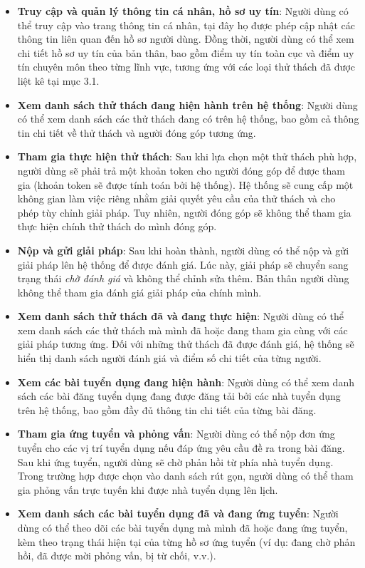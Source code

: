 \begin{itemize}
  \item \textbf{Truy cập và quản lý thông tin cá nhân, hồ sơ uy tín}: Người dùng có thể truy cập vào trang thông tin cá nhân, tại đây họ được phép cập nhật các thông tin liên quan đến hồ sơ người dùng.
        Đồng thời, người dùng có thể xem chi tiết hồ sơ uy tín của bản thân, bao gồm điểm uy tín toàn cục và điểm uy tín chuyên môn theo từng lĩnh vực, tương ứng với các loại thử thách đã được liệt kê tại mục 3.1.
  \item \textbf{Xem danh sách thử thách đang hiện hành trên hệ thống}: Người dùng có thể xem danh sách các thử thách đang có trên hệ thống, bao gồm cả thông tin chi tiết về thử thách và người đóng góp tương ứng.
  \item \textbf{Tham gia thực hiện thử thách}: Sau khi lựa chọn một thử thách phù hợp, người dùng sẽ phải trả một khoản token cho người đóng góp để được tham gia (khoản token sẽ được tính toán bởi hệ thống). Hệ thống sẽ cung cấp một không gian làm việc riêng nhằm giải quyết yêu cầu của thử thách và cho phép tùy chỉnh giải pháp.
        Tuy nhiên, người đóng góp sẽ không thể tham gia thực hiện chính thử thách do mình đóng góp.
  \item \textbf{Nộp và gửi giải pháp}: Sau khi hoàn thành, người dùng có thể nộp và gửi giải pháp lên hệ thống để được đánh giá. Lúc này, giải pháp sẽ chuyển sang trạng thái \textit{chờ đánh giá} và không thể chỉnh sửa thêm.
        Bản thân người dùng không thể tham gia đánh giá giải pháp của chính mình.
  \item \textbf{Xem danh sách thử thách đã và đang thực hiện}: Người dùng có thể xem danh sách các thử thách mà mình đã hoặc đang tham gia cùng với các giải pháp tương ứng.
        Đối với những thử thách đã được đánh giá, hệ thống sẽ hiển thị danh sách người đánh giá và điểm số chi tiết của từng người.
  \item \textbf{Xem các bài tuyển dụng đang hiện hành}: Người dùng có thể xem danh sách các bài đăng tuyển dụng đang được đăng tải bởi các nhà tuyển dụng trên hệ thống, bao gồm đầy đủ thông tin chi tiết của từng bài đăng.
  \item \textbf{Tham gia ứng tuyển và phỏng vấn}: Người dùng có thể nộp đơn ứng tuyển cho các vị trí tuyển dụng nếu đáp ứng yêu cầu đề ra trong bài đăng.
        Sau khi ứng tuyển, người dùng sẽ chờ phản hồi từ phía nhà tuyển dụng. Trong trường hợp được chọn vào danh sách rút gọn, người dùng có thể tham gia phỏng vấn trực tuyến khi được nhà tuyển dụng lên lịch.
  \item \textbf{Xem danh sách các bài tuyển dụng đã và đang ứng tuyển}: Người dùng có thể theo dõi các bài tuyển dụng mà mình đã hoặc đang ứng tuyển, kèm theo trạng thái hiện tại của từng hồ sơ ứng tuyển (ví dụ: đang chờ phản hồi, đã được mời phỏng vấn, bị từ chối, v.v.).
\end{itemize}


